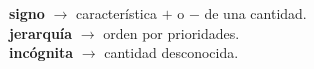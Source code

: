 \begin{tcolorbox}[
        enhanced,
        colback=orange!5!white,
        colframe=orange!35!white,
        coltitle=black,
        fonttitle=\bfseries,
        center title,
        title=Vocabulario]
    \textbf{signo}                 $\rightarrow$  característica $+$ o $-$ de una cantidad. \\
    \textbf{jerarquía}  $\rightarrow$ orden por prioridades.\\
    \textbf{incógnita}  $\rightarrow$ cantidad desconocida.\\
\end{tcolorbox}